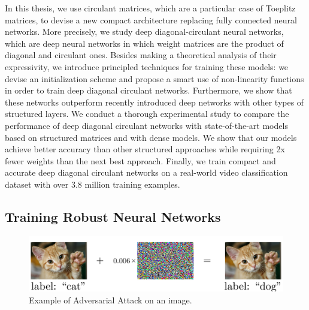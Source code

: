 
In this thesis, we use circulant matrices, which are a particular case of Toeplitz matrices, to devise a new compact architecture replacing fully connected neural networks.
More precisely, we study deep diagonal-circulant neural networks, which are deep neural networks in which weight matrices are the product of diagonal and circulant ones.
Besides making a theoretical analysis of their expressivity, we introduce principled techniques for training these models: we devise an initialization scheme and propose a smart use of non-linearity functions in order to train deep diagonal circulant networks. 
Furthermore, we show that these networks outperform recently introduced deep networks with other types of structured layers.
We conduct a thorough experimental study to compare the performance of deep diagonal circulant networks with state-of-the-art models based on structured matrices and with dense models.
We show that our models achieve better accuracy than other structured approaches while requiring 2x fewer weights than the next best approach.
Finally, we train compact and accurate deep diagonal circulant networks on a real-world video classification dataset with over 3.8 million training examples. 





\subsection{Training Robust Neural Networks}
\label{subsection:ch1-training_robust_neural_networks}

\begin{figure}[t]
  \centering
  \includegraphics[width=\textwidth]{figures/main/ch1-introduction/ExampleAdversarialCatDog.pdf}
  \caption{Example of Adversarial Attack on an image.}
  \label{figure:ch1-adversarial_image_example}
\end{figure}

